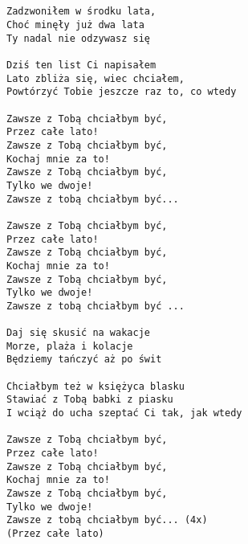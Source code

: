 \documentclass[12pt]{article}
\begin{document}
\subsection*{}
\begin{verbatim}
Zadzwoniłem w środku lata,
Choć minęły już dwa lata
Ty nadal nie odzywasz się

Dziś ten list Ci napisałem
Lato zbliża się, wiec chciałem,
Powtórzyć Tobie jeszcze raz to, co wtedy

Zawsze z Tobą chciałbym być,
Przez całe lato!
Zawsze z Tobą chciałbym być,
Kochaj mnie za to!
Zawsze z Tobą chciałbym być,
Tylko we dwoje!
Zawsze z tobą chciałbym być...

Zawsze z Tobą chciałbym być,
Przez całe lato!
Zawsze z Tobą chciałbym być,
Kochaj mnie za to!
Zawsze z Tobą chciałbym być,
Tylko we dwoje!
Zawsze z tobą chciałbym być ...

Daj się skusić na wakacje
Morze, plaża i kolacje
Będziemy tańczyć aż po świt

Chciałbym też w księżyca blasku
Stawiać z Tobą babki z piasku
I wciąż do ucha szeptać Ci tak, jak wtedy

Zawsze z Tobą chciałbym być,
Przez całe lato!
Zawsze z Tobą chciałbym być,
Kochaj mnie za to!
Zawsze z Tobą chciałbym być,
Tylko we dwoje!
Zawsze z tobą chciałbym być... (4x)
(Przez całe lato)
\end{verbatim}
\clearpage
\end{document}
